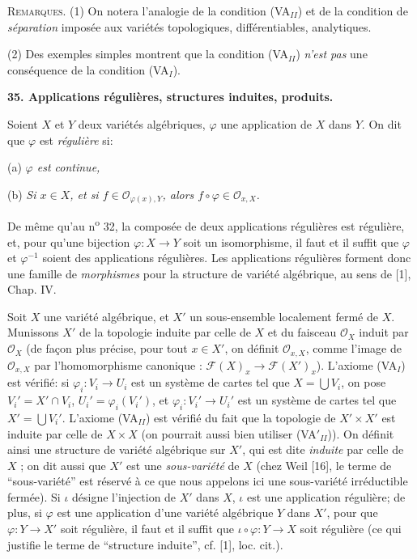 \textsc{Remarques}. (1) On notera l'analogie de la condition (VA$_{II}$) et de la condition de \textit{séparation} imposée aux variétés topologiques, différentiables, analytiques.

(2) Des exemples simples montrent que la condition (VA$_{II}$) \textit{n'est pas} une conséquence de la condition (VA$_I$).


\textbf{35. Applications régulières, structures induites, produits.}

Soient $X$ et $Y$ deux variétés algébriques, $\varphi$ une application de $X$ dans $Y$. On dit que $\varphi$ est \textit{régulière} si:

(a) \textit{$\varphi$ est continue,}

(b) \textit{Si $x \in X$, et si $f \in \mathcal{O}_{\varphi(x),Y}$, alors $f \circ \varphi \in \mathcal{O}_{x,X}$.}

De même qu'au n\textsuperscript{o} 32, la composée de deux applications régulières est régulière, et, pour qu'une bijection $\varphi : X \to Y$ soit un isomorphisme, il faut et il suffit que $\varphi$ et $\varphi^{-1}$ soient des applications régulières. Les applications régulières forment donc une famille de \textit{morphismes} pour la structure de variété algébrique, au sens de [1], Chap. IV.

Soit $X$ une variété algébrique, et $X'$ un sous-ensemble localement fermé de $X$. Munissons $X'$ de la topologie induite par celle de $X$ et du faisceau $\mathcal{O}_X$ induit par $\mathcal{O}_X$ (de façon plus précise, pour tout $x \in X'$, on définit $\mathcal{O}_{x,X}$, comme l'image de $\mathcal{O}_{x,X}$ par l'homomorphisme canonique : $\mathcal{F}(X)_x \to \mathcal{F}(X')_x$). L'axiome (VA$_I$) est vérifié: si $\varphi_i : V_i \to U_i$ est un système de cartes tel que $X = \bigcup V_i$, on pose $V_i' = X' \cap V_i$, $U_i' = \varphi_i(V_i')$, et $\varphi_i : V_i' \to U_i'$ est un système de cartes tel que $X' = \bigcup V_i'$. L'axiome (VA$_{II}$) est vérifié du fait que la topologie de $X' \times X'$ est induite par celle de $X \times X$ (on pourrait aussi bien utiliser (VA$'_{II}$)). On définit ainsi une structure de variété algébrique sur $X'$, qui est dite \textit{induite} par celle de $X$ ; on dit aussi que $X'$ est une \textit{sous-variété} de $X$ (chez Weil [16], le terme de ``sous-variété'' est réservé à ce que nous appelons ici une sous-variété irréductible fermée). Si $\iota$ désigne l'injection de $X'$ dans $X$, $\iota$ est une application régulière; de plus, si $\varphi$ est une application d'une variété algébrique $Y$ dans $X'$, pour que $\varphi : Y \to X'$ soit régulière, il faut et il suffit que $\iota \circ \varphi : Y \to X$ soit régulière (ce qui justifie le terme de ``structure induite'', cf. [1], loc. cit.).

